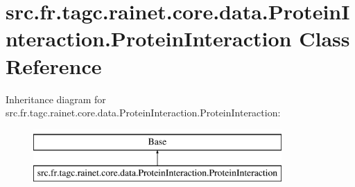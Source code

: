 \hypertarget{classsrc_1_1fr_1_1tagc_1_1rainet_1_1core_1_1data_1_1ProteinInteraction_1_1ProteinInteraction}{\section{src.\-fr.\-tagc.\-rainet.\-core.\-data.\-Protein\-Interaction.\-Protein\-Interaction Class Reference}
\label{classsrc_1_1fr_1_1tagc_1_1rainet_1_1core_1_1data_1_1ProteinInteraction_1_1ProteinInteraction}
}
Inheritance diagram for src.\-fr.\-tagc.\-rainet.\-core.\-data.\-Protein\-Interaction.\-Protein\-Interaction\-:\begin{figure}[H]
\begin{center}
\leavevmode
\includegraphics[height=2.000000cm]{classsrc_1_1fr_1_1tagc_1_1rainet_1_1core_1_1data_1_1ProteinInteraction_1_1ProteinInteraction}
\end{center}
\end{figure}
